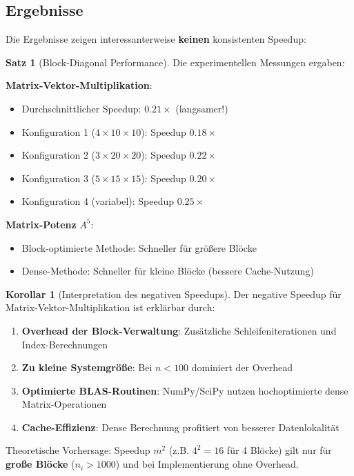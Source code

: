 ﻿\documentclass[a4paper,12pt]{report}
\theoremstyle{definition}
\newtheorem{satz}{Satz}
\newtheorem{korollar}{Korollar}
\begin{document}
	\subsection{Ergebnisse}
	
	Die Ergebnisse zeigen interessanterweise \textbf{keinen} konsistenten Speedup:
	
	\begin{satz}[Block-Diagonal Performance]
		Die experimentellen Messungen ergaben:
		
		\textbf{Matrix-Vektor-Multiplikation}:
		\begin{itemize}
			\item Durchschnittlicher Speedup: $0.21\times$ (langsamer!)
			\item Konfiguration 1 ($4 \times 10 \times 10$): Speedup $0.18\times$
			\item Konfiguration 2 ($3 \times 20 \times 20$): Speedup $0.22\times$
			\item Konfiguration 3 ($5 \times 15 \times 15$): Speedup $0.20\times$
			\item Konfiguration 4 (variabel): Speedup $0.25\times$
		\end{itemize}
		
		\textbf{Matrix-Potenz} $A^5$:
		\begin{itemize}
			\item Block-optimierte Methode: Schneller für größere Blöcke
			\item Dense-Methode: Schneller für kleine Blöcke (bessere Cache-Nutzung)
		\end{itemize}
	\end{satz}
	
	\begin{korollar}[Interpretation des negativen Speedups]
		Der negative Speedup für Matrix-Vektor-Multiplikation ist erklärbar durch:
		\begin{enumerate}
			\item \textbf{Overhead der Block-Verwaltung}: Zusätzliche Schleifeniterationen und Index-Berechnungen
			\item \textbf{Zu kleine Systemgröße}: Bei $n < 100$ dominiert der Overhead
			\item \textbf{Optimierte BLAS-Routinen}: NumPy/SciPy nutzen hochoptimierte dense Matrix-Operationen
			\item \textbf{Cache-Effizienz}: Dense Berechnung profitiert von besserer Datenlokalität
		\end{enumerate}
		
		Theoretische Vorhersage: Speedup $m^2$ (z.B. $4^2 = 16$ für 4 Blöcke) gilt nur für \textbf{große Blöcke} ($n_i > 1000$) und bei Implementierung ohne Overhead.
	\end{korollar}
	
\end{document}
